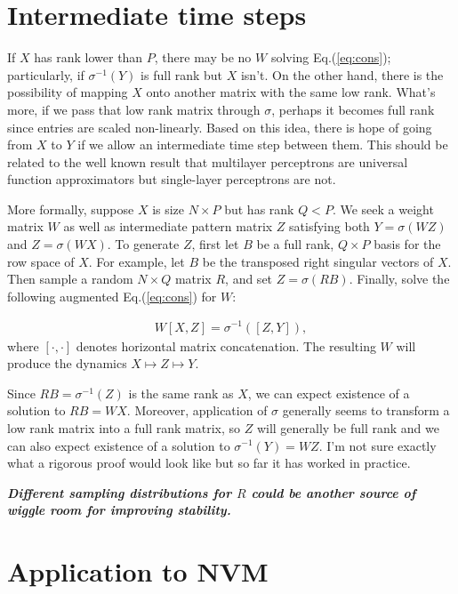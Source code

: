 \documentclass[pdftex,12pt,letterpaper]{article}
\begin{document}
\section{Intermediate time steps}

If $X$ has rank lower than $P$, there may be no $W$ solving Eq.\@ (\ref{eq:cons}); particularly, if $\sigma^{-1}(Y)$ is full rank but $X$ isn't.  On the other hand, there is the possibility of mapping $X$ onto another matrix with the same low rank.  What's more, if we pass that low rank matrix through $\sigma$, perhaps it becomes full rank since entries are scaled non-linearly.  Based on this idea, there is hope of going from $X$ to $Y$ if we allow an intermediate time step between them.  This should be related to the well known result that multilayer perceptrons are universal function approximators but single-layer perceptrons are not.

More formally, suppose $X$ is size $N\times P$ but has rank $Q < P$.  We seek a weight matrix $W$ as well as intermediate pattern matrix $Z$ satisfying both $Y = \sigma(WZ)$ and $Z = \sigma(WX)$.  To generate $Z$, first let $B$ be a full rank, $Q\times P$ basis for the row space of $X$.   For example, let $B$ be the transposed right singular vectors of $X$.  Then sample a random $N\times Q$ matrix $R$, and set $Z = \sigma(RB)$.  Finally, solve the following augmented Eq.\@ (\ref{eq:cons}) for $W$:

\begin{align}
W[X, Z] = \sigma^{-1}([Z, Y]),
\end{align}
where $[\cdot,\cdot]$ denotes horizontal matrix concatenation.  The resulting $W$ will produce the dynamics $X\mapsto Z\mapsto Y$.

Since $RB = \sigma^{-1}(Z)$ is the same rank as $X$, we can expect existence of a solution to $RB = WX$.  Moreover, application of $\sigma$ generally seems to transform a low rank matrix into a full rank matrix, so $Z$ will generally be full rank and we can also expect existence of a solution to $\sigma^{-1}(Y) = WZ$.  I'm not sure exactly what a rigorous proof would look like but so far it has worked in practice.

\textbf{\textit{Different sampling distributions for $R$ could be another source of wiggle room for improving stability.}}

\section{Application to NVM}
\end{document}
